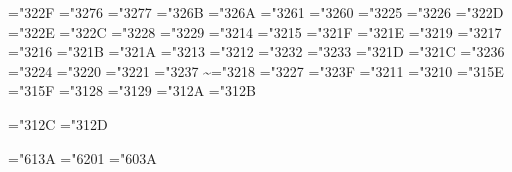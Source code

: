 \mathchardef\propto="322F
\mathchardef\sqsubseteq="3276
\mathchardef\sqsupseteq="3277
\mathchardef\parallel="326B
\mathchardef\mid="326A
\mathchardef\dashv="3261
\mathchardef\vdash="3260
\mathchardef\nearrow="3225
\mathchardef\searrow="3226
\mathchardef\nwarrow="322D
\mathchardef\swarrow="322E
\mathchardef\Leftrightarrow="322C
\mathchardef\Leftarrow="3228
\mathchardef\Rightarrow="3229
\def\neq{\not=} \let\ne=\neq
\mathchardef\leq="3214 \let\le=\leq
\mathchardef\geq="3215 \let\ge=\geq
\mathchardef\succ="321F
\mathchardef\prec="321E
\mathchardef\approx="3219
\mathchardef\succeq="3217
\mathchardef\preceq="3216
\mathchardef\supset="321B
\mathchardef\subset="321A
\mathchardef\supseteq="3213
\mathchardef\subseteq="3212
\mathchardef\in="3232
\mathchardef\ni="3233 \let\owns=\ni
\mathchardef\gg="321D
\mathchardef\ll="321C
\mathchardef\not="3236
\mathchardef\leftrightarrow="3224
\mathchardef\leftarrow="3220 \let\gets=\leftarrow
\mathchardef\rightarrow="3221 \let\to=\rightarrow
\mathchardef\mapstochar="3237 \def\mapsto{\mapstochar\rightarrow}
\mathchardef\sim="3218
\mathchardef\simeq="3227
\mathchardef\perp="323F
\mathchardef\equiv="3211
\mathchardef\asymp="3210
\mathchardef\smile="315E
\mathchardef\frown="315F
\mathchardef\leftharpoonup="3128
\mathchardef\leftharpoondown="3129
\mathchardef\rightharpoonup="312A
\mathchardef\rightharpoondown="312B

\def\joinrel{\mathrel{\mkern-3mu}}
\def\relbar{\mathrel{\smash-}} %
\def\Relbar{\mathrel=}
\mathchardef\lhook="312C \def\hookrightarrow{\lhook\joinrel\rightarrow}
\mathchardef\rhook="312D \def\hookleftarrow{\leftarrow\joinrel\rhook}
\def\bowtie{\mathrel\triangleright\joinrel\mathrel\triangleleft}
\def\models{\mathrel|\joinrel=}
\def\Longrightarrow{\Relbar\joinrel\Rightarrow}
\def\longrightarrow{\relbar\joinrel\rightarrow}
\def\longleftarrow{\leftarrow\joinrel\relbar}
\def\Longleftarrow{\Leftarrow\joinrel\Relbar}
\def\longmapsto{\mapstochar\longrightarrow}
\def\longleftrightarrow{\leftarrow\joinrel\rightarrow}
\def\Longleftrightarrow{\Leftarrow\joinrel\Rightarrow}
\def\iff{\;\Longleftrightarrow\;}

\mathchardef\ldotp="613A %
\mathchardef\cdotp="6201 %
\mathchardef\colon="603A %
\def\ldots{\mathinner{\ldotp\ldotp\ldotp}}
\def\cdots{\mathinner{\cdotp\cdotp\cdotp}}
\def\vdots{\vbox{\baselineskip4\p@ \lineskiplimit\z@
    \kern6\p@\hbox{.}\hbox{.}\hbox{.}}}
\def\ddots{\mathinner{\mkern1mu\raise7\p@\vbox{\kern7\p@\hbox{.}}\mkern2mu
    \raise4\p@\hbox{.}\mkern2mu\raise\p@\hbox{.}\mkern1mu}}

